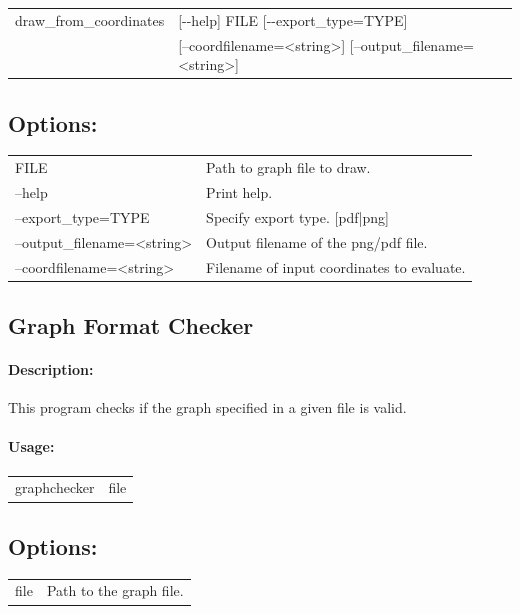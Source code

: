 \documentclass[11pt]{article}
\begin{document}
\begin{tabular}{ll}
 draw\_from\_coordinates&   [-{}-help] FILE [-{}-export\_type=TYPE]  \\
& [--coordfilename=<string>] [--output\_filename=<string>]



\end{tabular}
                          
\subsection*{Options:\\}

\begin{tabularx}{\textwidth}{lX}
  FILE                          & Path to graph file to draw.\\
  --help                        & Print help. \\
  --export\_type=TYPE           & Specify export type. [pdf|png]\\
  --output\_filename=<string>   & Output filename of the png/pdf file. \\
  --coordfilename=<string>      & Filename of input coordinates to evaluate. \\
\end{tabularx}

\vfill
\pagebreak
\vfill
\pagebreak
\subsection{Graph Format Checker}
\paragraph*{Description:} This program checks if the graph specified in a given file is valid. 
\paragraph*{Usage:\\} 
\begin{tabular}{ll}
graphchecker & file
\end{tabular}
\subsection*{Options:\\} 
\begin{tabularx}{\textwidth}{lX}
  file                       & Path to the graph file. \\
\end{tabularx}
\end{document}
